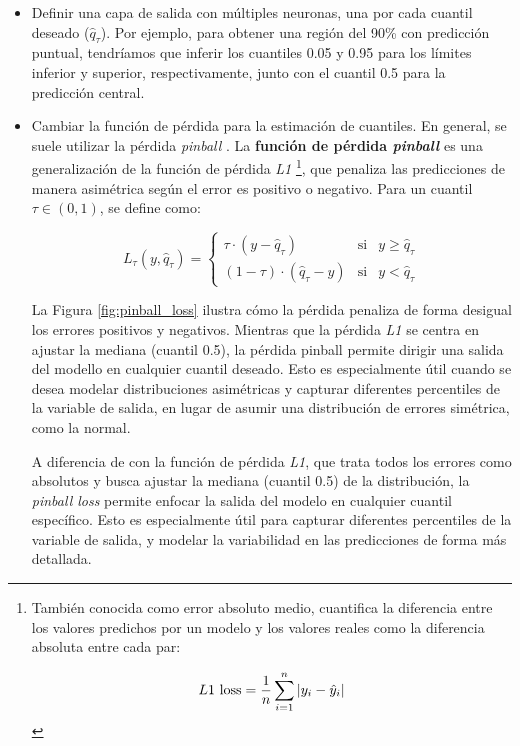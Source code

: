 \begin{itemize}

    \item Definir una capa de salida con múltiples neuronas, una por cada cuantil deseado ($\hat{q}_\tau$). Por ejemplo, para obtener una región del 90\% con predicción puntual, tendríamos que inferir los cuantiles 0.05 y 0.95 para los límites inferior y superior, respectivamente, junto con el cuantil 0.5 para la predicción central.

    \item Cambiar la función de pérdida para la estimación de cuantiles. En general, se suele utilizar la pérdida \textit{pinball} \cite{steinwart2011}. La \textbf{función de pérdida \textit{pinball}} es una generalización de la función de pérdida \textit{L1}%
    \footnote{
        También conocida como error absoluto medio, cuantifica la diferencia entre los valores predichos por un modelo y los valores reales como la diferencia absoluta entre cada par:
        
        $$
        L1\textnormal{ loss} = \frac{1}{n} \sum_{i=1}^n |y_i-\hat{y}_i|
        $$
    }, 
    que penaliza las predicciones de manera asimétrica según el error es positivo o negativo. Para un cuantil $\tau \in \left( 0,1\right)$, se define como:

    $$
    L_\tau(y,\hat{q}_\tau) = \left\{
        \begin{array}{rcl}
            \tau \cdot (y-\hat{q}_\tau) & \mbox{si} & y \ge \hat{q}_\tau
            \\
            (1-\tau) \cdot (\hat{q}_\tau-y) & \mbox{si} & y < \hat{q}_\tau
        \end{array}
    \right.
    $$

    La Figura \ref{fig:pinball_loss} ilustra cómo la pérdida penaliza de forma desigual los errores positivos y negativos. Mientras que la pérdida \textit{L1} se centra en ajustar la mediana (cuantil 0.5), la pérdida pinball permite dirigir una salida del modello en cualquier cuantil deseado. Esto es especialmente útil cuando se desea modelar distribuciones asimétricas y capturar diferentes percentiles de la variable de salida, en lugar de asumir una distribución de errores simétrica, como la normal.
    
    A diferencia de con la función de pérdida \textit{L1}, que trata todos los errores como absolutos y busca ajustar la mediana (cuantil 0.5) de la distribución, la \textit{pinball loss} permite enfocar la salida del modelo en cualquier cuantil específico. Esto es especialmente útil para capturar diferentes percentiles de la variable de salida, y modelar la variabilidad en las predicciones de forma más detallada.


\end{itemize}
